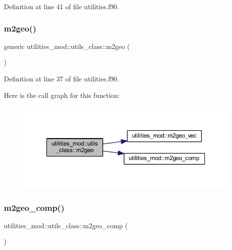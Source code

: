 Definition at line 41 of file utilities.\+f90.

\mbox{\label{structutilities__mod_1_1utils__class_a345230eb5aac79b78603538f0fd0e36e}} 
\subsubsection{\texorpdfstring{m2geo()}{m2geo()}}
{\footnotesize\ttfamily generic utilities\+\_\+mod\+::utils\+\_\+class\+::m2geo (\begin{DoxyParamCaption}{ }\end{DoxyParamCaption})\hspace{0.3cm}{\ttfamily [private]}}



Definition at line 37 of file utilities.\+f90.

Here is the call graph for this function\+:\nopagebreak
\begin{figure}[H]
\begin{center}
\leavevmode
\includegraphics[width=347pt]{structutilities__mod_1_1utils__class_a345230eb5aac79b78603538f0fd0e36e_cgraph}
\end{center}
\end{figure}
\mbox{\label{structutilities__mod_1_1utils__class_a8cceeee65240f821428cd4dc65fd5fa0}} 
\subsubsection{\texorpdfstring{m2geo\+\_\+comp()}{m2geo\_comp()}}
{\footnotesize\ttfamily utilities\+\_\+mod\+::utils\+\_\+class\+::m2geo\+\_\+comp (\begin{DoxyParamCaption}{ }\end{DoxyParamCaption})\hspace{0.3cm}{\ttfamily [private]}}



